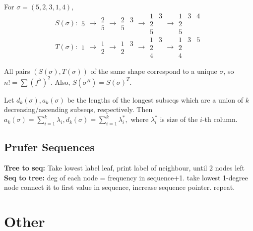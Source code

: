 For $\sigma=(5,2,3,1,4),$
$$S(\sigma): \begin{array}{c}
5
\end{array}\to \begin{array}{c}
2 \\ 
5
\end{array}\to \begin{array}{cc}
2 & 3 \\ 
5
\end{array}\to \begin{array}{cc}
1 & 3 \\ 
2 \\
5
\end{array}\to \begin{array}{ccc}
1 & 3 & 4\\ 
2 \\
5
\end{array}$$
$$T(\sigma): \begin{array}{c}
1
\end{array}\to \begin{array}{c}
1 \\ 
2
\end{array}\to \begin{array}{cc}
1 & 3 \\ 
2
\end{array}\to \begin{array}{cc}
1 & 3 \\ 
2 \\
4
\end{array}\to \begin{array}{ccc}
1 & 3 & 5\\ 
2 \\
4
\end{array}$$

All pairs $(S(\sigma),T(\sigma))$ of the same shape correspond to a unique $\sigma$, so
$n!=\sum (f^{\lambda})^2.$ Also, $S(\sigma^R)=S(\sigma)^T.$

Let $d_k(\sigma),a_k(\sigma)$ be the lengths of the longest subseqs which are a union of $k$ decreasing/ascending subseqs, respectively. Then $a_k(\sigma)=\sum_{i=1}^k\lambda_i, d_k(\sigma)=\sum_{i=1}^k\lambda^*_i,$ where $\lambda^*_i$ is size of the $i$-th column. 

\subsection{Prufer Sequences}
\textbf{Tree to seq:} Take lowest label leaf, print label of neighbour, until 2 nodes left\\
\textbf{Seq to tree:} deg of each node = frequency in sequence+1. take lowest 1-degree node
connect it to first value in sequence, increase sequence pointer. repeat.

\section{Other}
